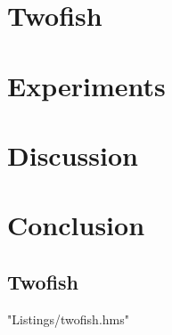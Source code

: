 \documentclass[a4paper,10pt,openright]{memoir}
\begin{document}
\chapter{Twofish}
\label{chapt - Twofish}



\chapter{Experiments}
\label{chapt - experiments}


\chapter{Discussion}
\label{chapt - Discussion}



\chapter{Conclusion}
\label{chapt - Conclusion}




\newpage

\renewcommand\bibname{References}




\clearpage
\newpage
\begin{appendices}
\renewcommand*{\lstlistingname}{Appendix}
\chapter{Twofish}
\label{appendix:A}
 {"Listings/twofish.hms"}
\end{appendices}
\end{document}
